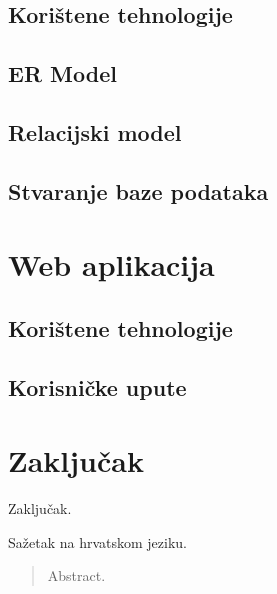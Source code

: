 \documentclass[times, utf8, zavrsni]{fer}
\begin{document}
\section{Korištene tehnologije}
\section{ER Model}
\section{Relacijski model}
\section{Stvaranje baze podataka}

\chapter{Web aplikacija}
\section{Korištene tehnologije}
\section{Korisničke upute}


\chapter{Zaključak}
Zaključak.





\begin{sazetak}
Sažetak na hrvatskom jeziku.

\end{sazetak}

\begin{abstract}
Abstract.

\end{abstract}
\end{document}

